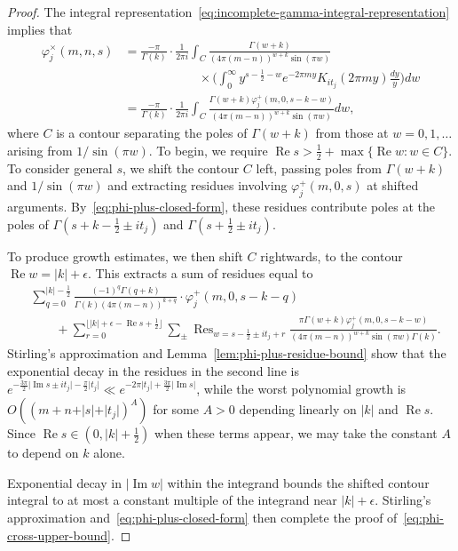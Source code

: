 \documentclass[11pt,reqno]{amsart}
\theoremstyle{plain}
\theoremstyle{definition}
\numberwithin{equation}{section}
\renewcommand{\Im}{\operatorname{Im}}
\renewcommand{\Re}{\operatorname{Re}}
\DeclareMathOperator*{\Res}{Res}
\begin{document}
\begin{proof}
The integral representation~\eqref{eq:incomplete-gamma-integral-representation} implies that
\begin{align}
	\varphi_j^\times(m,n,s)
		&=
			\frac{-\pi}{\Gamma(k)} 
			\cdot  \frac{1}{2\pi i} \int_C \frac{\Gamma(w+k)}{(4\pi(m-n))^{w+k} \sin(\pi w)} \\
		& \qquad\qquad \qquad
	\times\Big( \int_0^\infty \! y^{s-\frac{1}{2}-w} e^{-2\pi m y} K_{it_j}(2\pi m y) \frac{dy}{y} \Big) dw \\
		\label{eq:phi-cross-integral-representation}
		&= 
			\frac{-\pi}{\Gamma(k)} \cdot  \frac{1}{2\pi i} 
			\int_C \frac{\Gamma(w+k)\varphi_j^+(m,0, s-k-w)}{(4\pi(m-n))^{w+k} \sin(\pi w)} dw,
\end{align}
where $C$ is a contour separating the poles of $\Gamma(w+k)$ from those at $w=0,1,\ldots$ arising from $1/\sin(\pi w)$. To begin, we require $\Re s > \frac{1}{2} + \max \{\Re w: w \in C\}$. To consider general $s$, we shift the contour $C$ left, passing poles from $\Gamma(w+k)$ and $1/\sin(\pi w)$ and extracting residues involving $\varphi_j^+(m,0,s)$ at shifted arguments. By~\eqref{eq:phi-plus-closed-form}, these residues contribute poles at the poles of $\Gamma(s+k-\frac{1}{2} \pm it_j)$ and $\Gamma(s + \frac{1}{2} \pm it_j)$.

To produce growth estimates, we then shift $C$ rightwards, to the contour $\Re w = \vert k \vert + \epsilon$. This extracts a sum of residues equal to
\begin{align*}
	& \sum_{q = 0}^{\vert k \vert - \frac{1}{2}} 
			\frac{(-1)^q\Gamma(q+k)}{\Gamma(k) (4\pi(m-n))^{k+q}} \cdot \varphi_j^+(m,0,s-k-q) \\[-.38em]
	& \qquad + \!\!\!\!
		\sum_{r=0}^{\lfloor \vert k \vert +\epsilon - \Re s + \frac{1}{2} \rfloor} \!\!\!\!
		\sum_{\pm}
			\Res_{w = s-\frac{1}{2} \pm it_j +r}
				\frac{\pi \Gamma(w+k)\varphi_j^+(m,0, s-k-w)}{(4\pi(m-n))^{w+k} \sin(\pi w) \Gamma(k)}.
\end{align*}
Stirling's approximation and Lemma~\ref{lem:phi-plus-residue-bound} show that the exponential decay in the residues in the second line is $e^{-\frac{3\pi}{2} \vert \Im s \pm it_j \vert - \frac{\pi}{2} \vert t_j \vert} \ll e^{-2\pi \vert t_j \vert + \frac{3\pi}{2} \vert \Im s \vert}$, while the worst polynomial growth is $O((m+n+ \vert s \vert + \vert t_j \vert)^A)$ for some $A> 0$ depending linearly on $\vert k \vert$ and $\Re s $. Since $\Re s \in (0, \vert k \vert + \frac{1}{2})$ when these terms appear, we may take the constant $A$ to depend on $k$ alone.


Exponential decay in $\vert \Im w \vert$ within the integrand bounds the shifted contour integral to at most a constant multiple of the integrand near $\vert k \vert + \epsilon$. Stirling's approximation and~\eqref{eq:phi-plus-closed-form} then complete the proof of~\eqref{eq:phi-cross-upper-bound}.
\end{proof}
\end{document}
